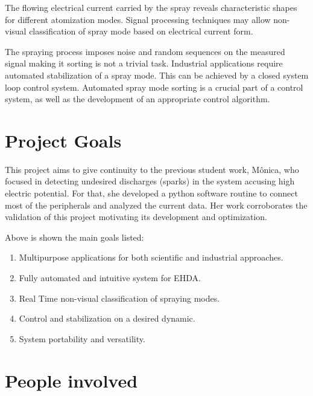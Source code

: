 The flowing electrical current carried by the spray reveals characteristic shapes for different atomization modes.
Signal processing techniques may allow non-visual classification of spray mode based on electrical current form. 

The spraying process imposes noise and random sequences on the measured signal making it sorting is not a trivial task.
Industrial applications require automated stabilization of a spray mode. 
This can be achieved by a closed system loop control system. 
Automated spray mode sorting is a crucial part of a control system, as well as the development of an appropriate control algorithm.

\section{Project Goals}
\label{sec:goals}

This project aims to give continuity to the previous student work\cite{Monica}, 
Mônica, who focused in detecting undesired discharges (sparks) in the system accusing high electric potential. 
For that, she developed a python software routine to connect most of the peripherals and analyzed the current data.
Her work corroborates the validation of this project motivating its development and optimization.

Above is shown the main goals listed:

\begin{enumerate}[]
\item Multipurpose applications for both scientific and industrial approaches.
\item Fully automated and intuitive system for EHDA.
\item Real Time non-visual classification of spraying modes.
\item Control and stabilization on a desired dynamic. 
\item System portability and versatility.
\end{enumerate}


\section{People involved}
\label{sec:companies}


